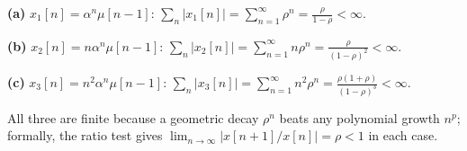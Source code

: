 \textbf{(a)} $x_1[n]=\alpha^{n}\mu[n-1]$:
$\displaystyle\sum_{n}|x_1[n]|=\sum_{n=1}^{\infty}\rho^{n}=\frac{\rho}{1-\rho}<\infty$. \checkmark

\textbf{(b)} $x_2[n]=n\alpha^{n}\mu[n-1]$:
$\displaystyle\sum_{n}|x_2[n]|=\sum_{n=1}^{\infty}n\rho^{n}=\frac{\rho}{(1-\rho)^{2}}<\infty$. \checkmark

\textbf{(c)} $x_3[n]=n^{2}\alpha^{n}\mu[n-1]$:
$\displaystyle\sum_{n}|x_3[n]|=\sum_{n=1}^{\infty}n^{2}\rho^{n}=\frac{\rho(1+\rho)}{(1-\rho)^{3}}<\infty$. \checkmark

All three are finite because a geometric decay $\rho^{n}$ beats any polynomial growth
$n^{p}$; formally, the ratio test gives $\lim_{n\to\infty}\bigl|x[n+1]/x[n]\bigr|=\rho<1$ in
each case.

